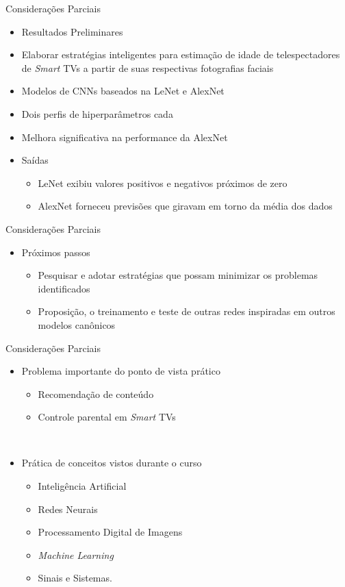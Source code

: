 \begin{frame}{Considerações Parciais}
	\begin{itemize}
		\item \alert{Resultados Preliminares}
		\item Elaborar estratégias inteligentes para estimação de idade de telespectadores de  \emph{Smart} TVs a partir de suas respectivas fotografias faciais\\
		\item Modelos de CNNs baseados na LeNet e AlexNet
		\item Dois perfis de hiperparâmetros cada
		\item Melhora significativa na performance da AlexNet
		\item Saídas
		\begin{itemize}
			\item LeNet exibiu valores positivos e negativos próximos de zero
			\item AlexNet forneceu previsões que giravam em torno da média dos dados
		\end{itemize}
  \end{itemize}
\end{frame}

\begin{frame}{Considerações Parciais}
	\begin{itemize}
		\item Próximos passos
		\begin{itemize}
			\item Pesquisar e adotar estratégias que possam minimizar os problemas identificados
			\item Proposição, o treinamento e teste de outras redes inspiradas em outros modelos canônicos
		\end{itemize}
	\end{itemize}
\end{frame}

\begin{frame}{Considerações Parciais}
	\begin{itemize}
		\item Problema importante do ponto de vista prático
		\begin{itemize}
			\item Recomendação de conteúdo
			\item Controle parental em \emph{Smart} TVs
		\end{itemize}
		\ \ \newline
		\item Prática de conceitos vistos durante o curso
		\begin{itemize}
			\item Inteligência Artificial
			\item Redes Neurais
			\item Processamento Digital de Imagens
			\item \emph{Machine Learning}
			\item Sinais e Sistemas.
		\end{itemize}
  \end{itemize}
\end{frame}
